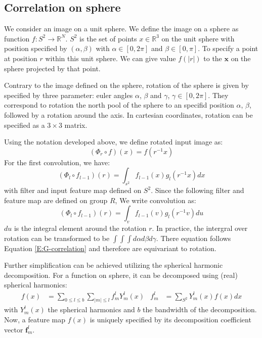 \documentclass{article}
\begin{document}
\subsection*{Correlation on sphere}
We consider an image on a unit sphere. We define the image on a sphere as function $f\colon S^2 \to \mathbb{R}^N$.
$S^2$ is the set of points $x\in \mathbb{R}^3$ on the unit sphere with position specified by $(\alpha, \beta)$ 
with $\alpha\in [0,2\pi]$ and $\beta \in [0,\pi]$. To specify a point at position $r$ within this unit sphere. 
We can give value $f(|r|)$ to the $\mathbf{x}$ on the sphere projected by that point. 

Contrary to the image defined on the sphere, rotation of the sphere is given by specified by three parameter: 
euler angles $\alpha$, $\beta$ and $\gamma$, $\gamma \in [0,2\pi]$. They correspond to rotation the north pool of the 
sphere to an specifid position $\alpha$, $\beta$, followed by a rotation around the axis. 
In cartesian coordinates, rotation can be specified as a $3\times 3$ matrix.

Using the notation developed above, we define rotated input image as: 
\begin{equation}
    (\Phi_r \circ f) (x) = f(r^{-1}x)
\end{equation}
For the first convolution, we have:
\begin{equation}
    \label{E:convolution_s2}
    (\Phi_l \circ f_{l-1}) (r) = \int_{s^2} f_{l-1}(x)g_l(r^{-1}x) dx
\end{equation}
with filter and input feature map defined on $S^2$. 
Since the following filter and feature map are defined on group $R$, We write convolution as:
\begin{equation}
    \label{E:convolution_r}
    (\Phi_l \circ f_{l-1}) (r) = \int_v f_{l-1}(v)g_l(r^{-1}v) du 
\end{equation}
$du$ is the integral element around the rotation $r$. In practice, the intergral over rotation can be transformed 
to be $\int\int\int d\alpha d\beta d\gamma$. There equation follows Equation \eqref{E:G-correlation} and therefore 
are equivariant to rotation.

Further simplification can be achieved utilizing the spherical harmonic decomposition. For 
a function on sphere, it can be decomposed using (real) spherical harmonics:
\begin{align}
    f(x) &= \sum_{0\leq l \leq b} \sum_{|m|\leq l} f_m^l Y_m^l(x) &  f_m^l &= \sum_{S^2} Y_m^l(x) f(x) dx  
    \label{E:s2_fft}
\end{align}
with $Y_m^l(x)$ the spherical harmonics and $b$ the bandwidth of the decomposition. 
Now, a feature map $f(x)$ is uniquely specified by its decomposition coefficient vector $\mathbf{f}_m^l$. 
\end{document}
